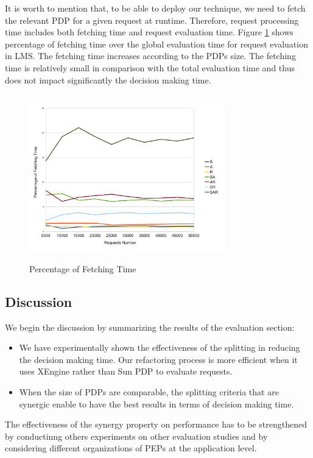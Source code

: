 It is worth to mention that, to be able to deploy our technique, we need to fetch the relevant PDP for a given request at runtime. 
Therefore, request processing time includes both fetching time and request evaluation time.
Figure \ref{Fetching Time} shows percentage of fetching time over the global evaluation time for request evaluation in LMS. 
The fetching time increases according to the PDPs size. The fetching time is relatively small in comparison with the total evaluation time and thus 
does not impact significantly the decision making time.
\begin{figure}[!h]
  \centering
\includegraphics[width=8.5cm, height=7.2cm]{fetching.pdf}
\begin{center}
\caption{Percentage of Fetching Time}
\label{Fetching Time}
\end{center}
\end{figure}
\subsection{Discussion}
We begin the discussion by summarizing the results of the evaluation section:
\begin{itemize}
 \item We have experimentally shown the effectiveness of the splitting in reducing the decision making time. Our refactoring process is more efficient when 
it uses XEngine rather than Sun PDP to evaluate requests.
 \item When the size of PDPs are comparable, the splitting criteria that are synergic enable to have the best results in terms of 
decision making time.
\end{itemize}
The effectiveness of the synergy property on performance has to be strengthened by conductinng others experiments 
on other evaluation studies and by considering different organizations of PEPs at the application level.